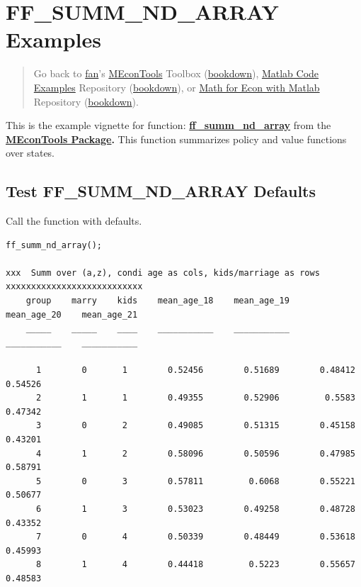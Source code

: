 \documentclass[
]{book}
\begin{document}
\hypertarget{ff_summ_nd_array-examples}{%
\section{FF\_SUMM\_ND\_ARRAY Examples}\label{ff_summ_nd_array-examples}}

\begin{quote}
Go back to \href{http://fanwangecon.github.io/}{fan}'s \href{https://fanwangecon.github.io/MEconTools/}{MEconTools} Toolbox (\href{https://fanwangecon.github.io/MEconTools/bookdown}{bookdown}), \href{https://fanwangecon.github.io/M4Econ/}{Matlab Code Examples} Repository (\href{https://fanwangecon.github.io/M4Econ/bookdown}{bookdown}), or \href{https://fanwangecon.github.io/Math4Econ/}{Math for Econ with Matlab} Repository (\href{https://fanwangecon.github.io/Math4Econ/bookdown}{bookdown}).
\end{quote}

This is the example vignette for function:
\href{https://github.com/FanWangEcon/MEconTools/blob/master/MEconTools/summ/ff_summ_nd_array.m}{\textbf{ff\_summ\_nd\_array}}
from the \href{https://fanwangecon.github.io/MEconTools/}{\textbf{MEconTools
Package}}\textbf{.} This function
summarizes policy and value functions over states.

\hypertarget{test-ff_summ_nd_array-defaults}{%
\subsection{Test FF\_SUMM\_ND\_ARRAY Defaults}\label{test-ff_summ_nd_array-defaults}}

Call the function with defaults.

\begin{verbatim}
ff_summ_nd_array();

xxx  Summ over (a,z), condi age as cols, kids/marriage as rows  xxxxxxxxxxxxxxxxxxxxxxxxxxx
    group    marry    kids    mean_age_18    mean_age_19    mean_age_20    mean_age_21
    _____    _____    ____    ___________    ___________    ___________    ___________

      1        0       1        0.52456        0.51689        0.48412        0.54526  
      2        1       1        0.49355        0.52906         0.5583        0.47342  
      3        0       2        0.49085        0.51315        0.45158        0.43201  
      4        1       2        0.58096        0.50596        0.47985        0.58791  
      5        0       3        0.57811         0.6068        0.55221        0.50677  
      6        1       3        0.53023        0.49258        0.48728        0.43352  
      7        0       4        0.50339        0.48449        0.53618        0.45993  
      8        1       4        0.44418         0.5223        0.55657        0.48583  
\end{verbatim}
\end{document}
